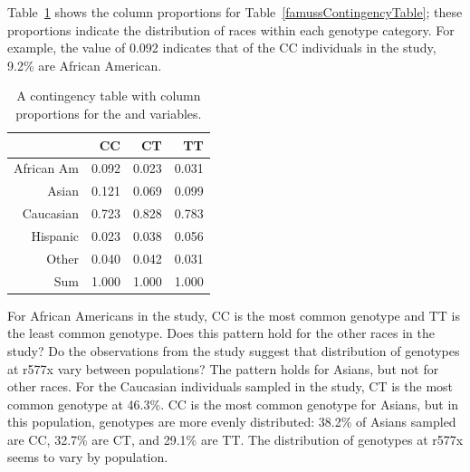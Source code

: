 
Table~\ref{famussColPropTable} shows the column proportions for Table~\ref{famussContingencyTable}; these proportions indicate the distribution of races within each genotype category. For example, the value of 0.092 indicates that of the CC individuals in the study, 9.2\% are African American. 


\begin{table}[ht]
	\centering
	\begin{tabular}{rrrr}
		\hline
		& CC & CT & TT \\ 
		\hline
		African Am & 0.092 & 0.023 & 0.031 \\ 
		Asian & 0.121 & 0.069 & 0.099 \\ 
		Caucasian & 0.723 & 0.828 & 0.783 \\ 
		Hispanic & 0.023 & 0.038 & 0.056 \\ 
		Other & 0.040 & 0.042 & 0.031 \\ 
		Sum & 1.000 & 1.000 & 1.000 \\
		\hline
	\end{tabular}
	\caption{A contingency table with column proportions for the  and  variables.} 
	\label{famussColPropTable}
\end{table}


\begin{example}{For African Americans in the study, CC is the most common genotype and TT is the least common genotype. Does this pattern hold for the other races in the study? Do the observations from the study suggest that distribution of genotypes at r577x vary between populations?} 
	The pattern holds for Asians, but not for other races. For the Caucasian individuals sampled in the study, CT is the most common genotype at 46.3\%. CC is the most common genotype for Asians, but in this population, genotypes are more evenly distributed: 38.2\% of Asians sampled are CC, 32.7\% are CT, and 29.1\% are TT. The distribution of genotypes at r577x seems to vary by population.
\end{example}


